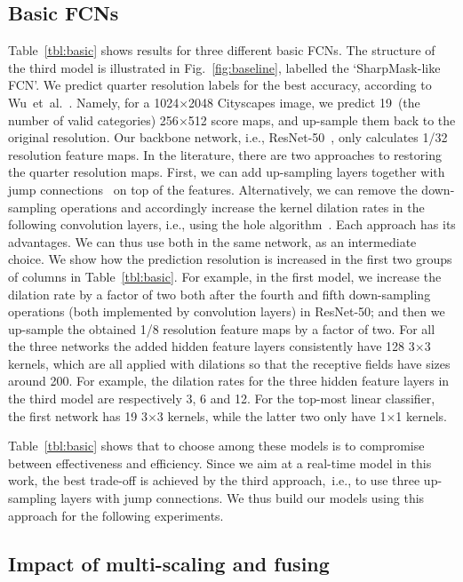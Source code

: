 \documentclass[10pt,twocolumn,letterpaper]{article}
\begin{document}
\subsection{Basic FCNs}
Table~\ref{tbl:basic} shows results for three different basic FCNs.
The structure of the third model is illustrated in Fig.~\ref{fig:baseline},
labelled the `SharpMask-like FCN'.
We predict quarter resolution labels for the best accuracy, according to Wu~et~al.~\cite{InstanceSegmentation.2016.Wu}.
Namely, for a 1024$\times$2048 Cityscapes image,
we predict 19~(the number of valid categories) 256$\times$512 score maps,
and up-sample them back to the original resolution.
Our backbone network, i.e., ResNet-50~\cite{ResNet.CVPR.2016.He}, only calculates 1/32 resolution feature maps.
In the literature, there are two approaches to restoring the quarter resolution maps.
First, we can add up-sampling layers together with jump connections~\cite{FCN.CVPR.2015.Long} on top of the features.
Alternatively, we can remove the down-sampling operations and accordingly increase the kernel dilation rates in the following convolution layers, i.e., using the hole algorithm~\cite{DeepLab.ICLR.2015.Chen}.
Each approach has its advantages.
We can thus use both in the same network, as an intermediate choice.
We show how the prediction resolution is increased in the first two groups of columns in Table~\ref{tbl:basic}.
For example, in the first model, we increase the dilation rate by a factor of two both after the fourth and fifth down-sampling operations (both implemented by convolution layers) in ResNet-50;
and then we up-sample the obtained 1/8 resolution feature maps by a factor of two.
For all the three networks the added hidden feature layers consistently have 128 3$\times$3 kernels,
which are all applied with dilations so that the receptive fields have sizes around 200.
For example, the dilation rates for the three hidden feature layers in the third model are respectively 3, 6 and 12.
For the top-most linear classifier, the first network has 19 3$\times$3 kernels,
while the latter two only have 1$\times$1 kernels.

Table~\ref{tbl:basic} shows that to choose among these models is to compromise between effectiveness and efficiency.
Since we aim at a real-time model in this work,
the best trade-off is achieved by the third approach,~i.e.,
to use three up-sampling layers with jump connections.
We thus build our models using this approach for the following experiments.


%
\subsection{Impact of multi-scaling and fusing}\label{subsec:multi-column}
\end{document}
